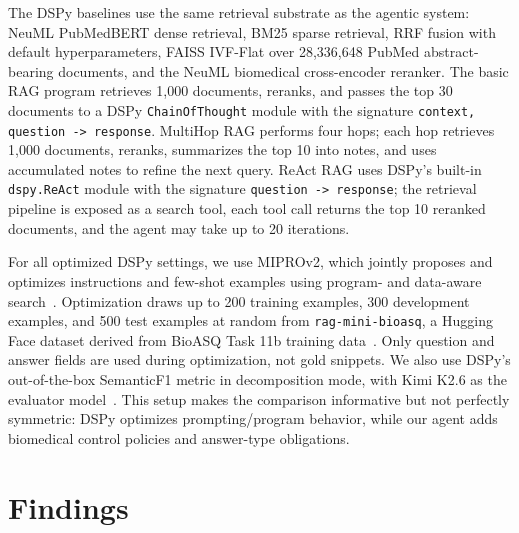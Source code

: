\documentclass[sigconf,nonacm]{acmart}
\begin{document}
The DSPy baselines use the same retrieval substrate as the agentic system: NeuML PubMedBERT dense retrieval, BM25 sparse retrieval, RRF fusion with default hyperparameters, FAISS IVF-Flat over 28,336,648 PubMed abstract-bearing documents, and the NeuML biomedical cross-encoder reranker. The basic RAG program retrieves 1,000 documents, reranks, and passes the top 30 documents to a DSPy \texttt{ChainOfThought} module with the signature \texttt{context, question -> response}. MultiHop RAG performs four hops; each hop retrieves 1,000 documents, reranks, summarizes the top 10 into notes, and uses accumulated notes to refine the next query. ReAct RAG uses DSPy's built-in \texttt{dspy.ReAct} module with the signature \texttt{question -> response}; the retrieval pipeline is exposed as a search tool, each tool call returns the top 10 reranked documents, and the agent may take up to 20 iterations.

For all optimized DSPy settings, we use MIPROv2, which jointly proposes and optimizes instructions and few-shot examples using program- and data-aware search~\cite{miprov2, khattab2024optimizing}. Optimization draws up to 200 training examples, 300 development examples, and 500 test examples at random from \texttt{rag-mini-bioasq}, a Hugging Face dataset derived from BioASQ Task 11b training data~\cite{rag_datasets}. Only question and answer fields are used during optimization, not gold snippets. We also use DSPy's out-of-the-box SemanticF1 metric in decomposition mode, with Kimi K2.6 as the evaluator model~\cite{dspy_semanticf1, dspy_eval}. This setup makes the comparison informative but not perfectly symmetric: DSPy optimizes prompting/program behavior, while our agent adds biomedical control policies and answer-type obligations.

\section{Findings}
\end{document}
